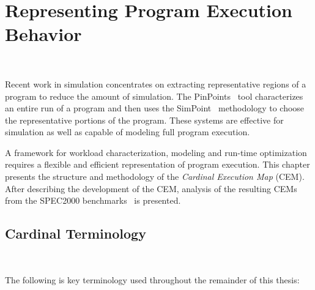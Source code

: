 \chapter{Representing Program Execution Behavior}~\label{chap:methodology}

Recent work in simulation concentrates on extracting
representative regions of a program to reduce the amount of
simulation.  The PinPoints~\cite{pp-1} tool characterizes an entire run of
a program and then uses the SimPoint~\cite{simpoint-1, simpoint-2} methodology to choose the
representative portions of the program. These systems are
effective for simulation as well as capable of modeling full
program execution.

A framework for workload characterization, modeling and run-time
optimization requires a flexible and efficient representation of
program execution. This chapter presents the structure and
methodology of the \textit{Cardinal Execution Map} (CEM). After
describing the development of the CEM, analysis of the resulting CEMs
from the SPEC2000 benchmarks~\cite{spec:2000} is presented.

\section{Cardinal Terminology}~\label{sec:methtermonology}

The following is key terminology used throughout the remainder of this
thesis:

